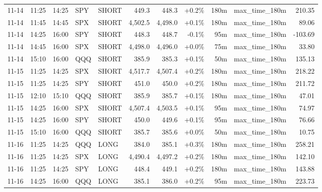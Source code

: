\documentclass[11pt,a4paper,twoside]{article}
\begin{document}
\begin{center}
\begin{longtable}{>{\color{txtmain}}l l l l l r r r r >{\color{txtmain}}l r}
11-14 & 11:25 & 14:25 & SPY & SHORT & 449.3 & 448.3 & \textcolor{wingreen}{+0.2\%} & 180m & max\_time\_180m & \textcolor{wingreen}{210.35} \\
11-14 & 11:45 & 14:45 & SPX & SHORT & 4,502.5 & 4,498.0 & \textcolor{wingreen}{+0.1\%} & 180m & max\_time\_180m & \textcolor{wingreen}{89.06} \\
11-14 & 14:25 & 16:00 & SPY & SHORT & 448.3 & 448.7 & \textcolor{lossred}{-0.1\%} & 95m & max\_time\_180m & \textcolor{lossred}{-103.69} \\
11-14 & 14:45 & 16:00 & SPX & SHORT & 4,498.0 & 4,496.0 & \textcolor{wingreen}{+0.0\%} & 75m & max\_time\_180m & \textcolor{wingreen}{33.80} \\
11-14 & 15:10 & 16:00 & QQQ & SHORT & 385.9 & 385.3 & \textcolor{wingreen}{+0.1\%} & 50m & max\_time\_180m & \textcolor{wingreen}{135.13} \\
11-15 & 11:25 & 14:25 & SPX & SHORT & 4,517.7 & 4,507.4 & \textcolor{wingreen}{+0.2\%} & 180m & max\_time\_180m & \textcolor{wingreen}{218.22} \\
11-15 & 11:25 & 14:25 & SPY & SHORT & 451.0 & 450.0 & \textcolor{wingreen}{+0.2\%} & 180m & max\_time\_180m & \textcolor{wingreen}{211.72} \\
11-15 & 12:10 & 15:10 & QQQ & SHORT & 385.9 & 385.7 & \textcolor{wingreen}{+0.1\%} & 180m & max\_time\_180m & \textcolor{wingreen}{47.01} \\
11-15 & 14:25 & 16:00 & SPX & SHORT & 4,507.4 & 4,503.5 & \textcolor{wingreen}{+0.1\%} & 95m & max\_time\_180m & \textcolor{wingreen}{74.97} \\
11-15 & 14:25 & 16:00 & SPY & SHORT & 450.0 & 449.6 & \textcolor{wingreen}{+0.1\%} & 95m & max\_time\_180m & \textcolor{wingreen}{76.66} \\
11-15 & 15:10 & 16:00 & QQQ & SHORT & 385.7 & 385.6 & \textcolor{wingreen}{+0.0\%} & 50m & max\_time\_180m & \textcolor{wingreen}{10.75} \\
11-16 & 11:25 & 14:25 & QQQ & LONG & 384.0 & 385.1 & \textcolor{wingreen}{+0.3\%} & 180m & max\_time\_180m & \textcolor{wingreen}{258.21} \\
11-16 & 11:25 & 14:25 & SPX & LONG & 4,490.4 & 4,497.2 & \textcolor{wingreen}{+0.2\%} & 180m & max\_time\_180m & \textcolor{wingreen}{142.10} \\
11-16 & 11:25 & 14:25 & SPY & LONG & 448.4 & 449.1 & \textcolor{wingreen}{+0.2\%} & 180m & max\_time\_180m & \textcolor{wingreen}{143.88} \\
11-16 & 14:25 & 16:00 & QQQ & LONG & 385.1 & 386.0 & \textcolor{wingreen}{+0.2\%} & 95m & max\_time\_180m & \textcolor{wingreen}{223.73} \\

\end{longtable}
\end{center}
\end{document}
